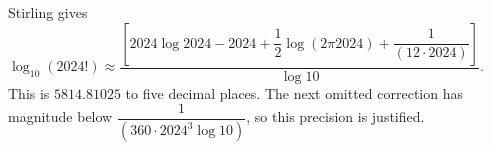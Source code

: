 Stirling gives $\log_{10}(2024!)\approx\dfrac{[2024\log2024-2024+\dfrac{1}{2}\log(2\pi2024)+\dfrac{1}{(12\cdot2024)}]}{\log10}$. This is $\boxed{5814.81025}$ to five decimal places. The next omitted correction has magnitude below $\dfrac{1}{(360\cdot2024^3\log10)}$, so this precision is justified.
